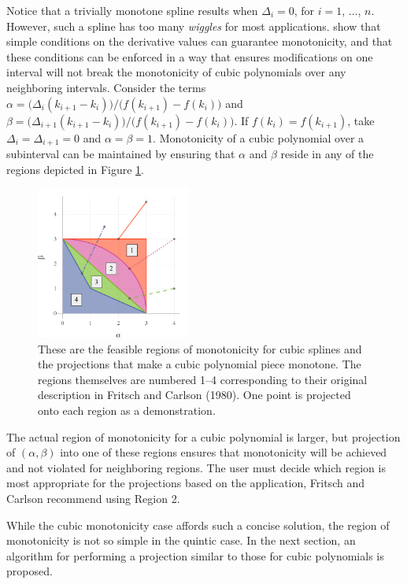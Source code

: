 \documentclass{scspaperproc}
\theoremstyle{scsthe}
\begin{document}
Notice that a trivially monotone spline results when $\Delta_i = 0$, for $i = 1$, $\ldots$, $n$. However, such a spline has too many \textit{wiggles} for most applications.  show that simple conditions on the derivative values can guarantee monotonicity, and that these conditions can be enforced in a way that ensures modifications on one interval will not break the monotonicity of cubic polynomials over any neighboring intervals. Consider the terms $\alpha = \big(\Delta_i (k_{i+1}-k_i)\big) / \big(f(k_{i+1}) - f(k_i)\big)$ and $\beta = \big(\Delta_{i+1}(k_{i+1}-k_i)\big) / \big(f(k_{i+1}) - f(k_i)\big)$. If $f(k_i) = f(k_{i+1})$, take $\Delta_i = \Delta_{i+1} =0$ and $\alpha =\beta =1$. Monotonicity of a cubic polynomial over a subinterval can be maintained by ensuring that $\alpha$ and $\beta$ reside in any of the regions depicted in Figure \ref{fig:projection}.

\begin{figure}
  \centering
  \includegraphics[width=0.45\textwidth]{cubic_projection_demonstration}
  \caption{These are the feasible regions of monotonicity for cubic splines and the projections that make a cubic polynomial piece monotone. The regions themselves are numbered 1--4 corresponding to their original description in Fritsch and Carlson (1980). One point is projected onto each region as a demonstration.}\label{fig:projection}
\end{figure}

The actual region of monotonicity for a cubic polynomial is larger, but projection of $(\alpha, \beta)$ into one of these regions ensures that monotonicity will be achieved and not violated for neighboring regions. The user must decide which region is most appropriate for the projections based on the application, Fritsch and Carlson recommend using Region 2.

While the cubic monotonicity case affords such a concise solution, the region of monotonicity is not so simple in the quintic case. In the next section, an algorithm for performing a projection similar to those for cubic polynomials is proposed.
\end{document}
